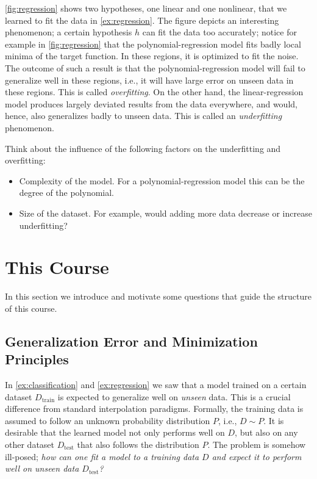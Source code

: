   
\autoref{fig:regression} shows two hypotheses, one linear and one nonlinear, that we learned to fit the data in
\autoref{ex:regression}. The figure depicts an interesting phenomenon; a certain
hypothesis $h$ can fit the data too accurately; notice for example in
\autoref{fig:regression} that the polynomial-regression model fits badly local
minima of the target function. In these regions, it is optimized to fit the
noise. The outcome of such a result is that the polynomial-regression model will
fail to generalize well in these regions, i.e., it will have large error on
unseen data in these regions. This is called \emph{overfitting}.
On the other hand, the linear-regression model produces largely deviated results from
the data everywhere, and would, hence, also generalizes badly to unseen data.
This is called an \emph{underfitting} phenomenon. 

Think about the influence of the following factors on the underfitting and
overfitting:
\begin{itemize}
    \item Complexity of the model. For a polynomial-regression model this can be
    the degree of the polynomial. 
    \item Size of the dataset. For example, would adding more data decrease or
    increase underfitting?
\end{itemize}


\section{This Course}
In this section we introduce and motivate some questions that guide the
structure of this course.  
\subsection{Generalization Error and Minimization Principles}
In \autoref{ex:classification} and \autoref{ex:regression} we saw that a model
trained on a certain dataset $D_{\text{train}}$ is expected to generalize well on \emph{unseen}
data. This is a crucial difference from standard interpolation paradigms.
Formally, the training data is assumed to follow an unknown probability
distribution $P$, i.e., $D \sim P$. It is desirable that the learned model
not only performs well on $D$, but also on any other dataset $D_\text{test}$ that
also follows the distribution $P$. The problem is somehow ill-posed; \emph{how can one
fit a model to a training data $D$ and expect it to perform well on unseen data
$D_{\text{test}}$?}

